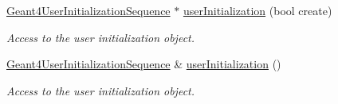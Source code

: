 \begin{DoxyCompactItemize}
\hyperlink{class_d_d4hep_1_1_simulation_1_1_geant4_user_initialization_sequence}{Geant4UserInitializationSequence} $\ast$ \hyperlink{class_d_d4hep_1_1_simulation_1_1_geant4_action_container_a04ba4fd85ae343b856d73dcb3cc0e9b3}{userInitialization} (bool create)
\begin{DoxyCompactList}\small\item\em Access to the user initialization object. \item\end{DoxyCompactList}\item 
\hyperlink{class_d_d4hep_1_1_simulation_1_1_geant4_user_initialization_sequence}{Geant4UserInitializationSequence} \& \hyperlink{class_d_d4hep_1_1_simulation_1_1_geant4_action_container_a22b7e6487bab568fec3798fe1e1593f0}{userInitialization} ()
\begin{DoxyCompactList}\small\item\em Access to the user initialization object. \item\end{DoxyCompactList}\end{DoxyCompactItemize}

